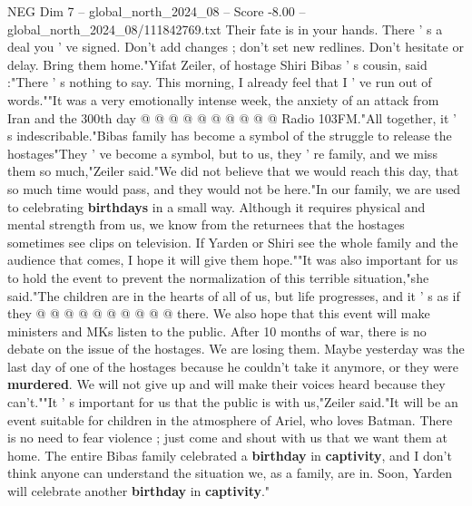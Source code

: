 \begin{textsample}{NEG Dim 7 – global\_north\_2024\_08 – Score -8.00 – global\_north\_2024\_08/111842769.txt}
Their fate is in your hands.
There ' s a deal you ' ve signed.
Don't add changes ; don't set new redlines.
Don't hesitate or delay.
Bring them home."Yifat Zeiler, of hostage Shiri Bibas ' s cousin, said :"There ' s nothing to say.
This morning, I already feel that I ' ve run out of words.""It was a very emotionally intense week, the anxiety of an attack from Iran and the 300th day @ @ @ @ @ @ @ @ @ @ Radio 103FM."All together, it ' s indescribable."Bibas family has become a symbol of the struggle to release the hostages"They ' ve become a symbol, but to us, they ' re family, and we miss them so much,"Zeiler said."We did not believe that we would reach this day, that so much time would pass, and they would not be here."In our family, we are used to celebrating \textbf{birthdays} in a small way.
Although it requires physical and mental strength from us, we know from the returnees that the hostages sometimes see clips on television.
If Yarden or Shiri see the whole family and the audience that comes, I hope it will give them hope.""It was also important for us to hold the event to prevent the normalization of this terrible situation,"she said."The children are in the hearts of all of us, but life progresses, and it ' s as if they @ @ @ @ @ @ @ @ @ @ there.
We also hope that this event will make ministers and MKs listen to the public.
After 10 months of war, there is no debate on the issue of the hostages.
We are losing them.
Maybe yesterday was the last day of one of the hostages because he couldn't take it anymore, or they were \textbf{murdered}.
We will not give up and will make their voices heard because they can't.""It ' s important for us that the public is with us,"Zeiler said."It will be an event suitable for children in the atmosphere of Ariel, who loves Batman.
There is no need to fear violence ; just come and shout with us that we want them at home.
The entire Bibas family celebrated a \textbf{birthday} in \textbf{captivity}, and I don't think anyone can understand the situation we, as a family, are in.
Soon, Yarden will celebrate another \textbf{birthday} in \textbf{captivity}."

\end{textsample}
